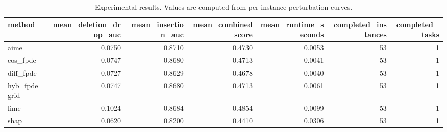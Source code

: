 \begin{table}[t]
\caption{Experimental results. Values are computed from per-instance perturbation curves.}
\label{tab:main_results_computed}
\centering
\begin{tabular}{lrrrrrr}
\toprule
method & mean\_deletion\_drop\_auc & mean\_insertion\_auc & mean\_combined\_score & mean\_runtime\_seconds & completed\_instances & completed\_tasks \\
\midrule
aime & 0.0750 & 0.8710 & 0.4730 & 0.0053 & 53 & 1 \\
cos\_fpde & 0.0747 & 0.8680 & 0.4713 & 0.0041 & 53 & 1 \\
diff\_fpde & 0.0727 & 0.8629 & 0.4678 & 0.0040 & 53 & 1 \\
hyb\_fpde\_grid & 0.0747 & 0.8680 & 0.4713 & 0.0061 & 53 & 1 \\
lime & 0.1024 & 0.8684 & 0.4854 & 0.0099 & 53 & 1 \\
shap & 0.0620 & 0.8200 & 0.4410 & 0.0306 & 53 & 1 \\
\bottomrule
\end{tabular}

\end{table}
